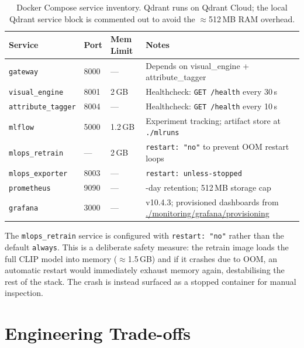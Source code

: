 \documentclass[12pt]{article}
\begin{document}
\begin{table}[H]
\centering
\small
\setlength{\tabcolsep}{4pt}
\begin{tabular}{@{} >{\RaggedRight\arraybackslash}p{2.8cm} p{0.9cm} p{1.4cm} >{\RaggedRight\arraybackslash}p{7.5cm} @{}}
\toprule
\textbf{Service} & \textbf{Port} & \textbf{Mem Limit} & \textbf{Notes} \\ \midrule
\texttt{gateway}          & 8000 & ---    & Depends on visual\_engine + attribute\_tagger \\[2pt]
\texttt{visual\_engine}   & 8001 & 2\,GB  & Healthcheck: \texttt{GET /health} every 30\,s \\[2pt]
\texttt{attribute\_tagger}& 8004 & ---    & Healthcheck: \texttt{GET /health} every 10\,s \\[2pt]
\texttt{mlflow}           & 5000 & 1.2\,GB& Experiment tracking; artifact store at \texttt{./mlruns} \\[2pt]
\texttt{mlops\_retrain}   & ---  & 2\,GB  & \texttt{restart: "no"} to prevent OOM restart loops \\[2pt]
\texttt{mlops\_exporter}  & 8003 & ---    & \texttt{restart: unless-stopped} \\[2pt]
\texttt{prometheus}       & 9090 & ---    & 15-day retention; 512\,MB storage cap \\[2pt]
\texttt{grafana}          & 3000 & ---    & v10.4.3; provisioned dashboards from \url{./monitoring/grafana/provisioning} \\ \bottomrule
\end{tabular}
\caption{Docker Compose service inventory. Qdrant runs on Qdrant Cloud; the local Qdrant service block is commented out to avoid the $\approx$512\,MB RAM overhead.}
\label{tab:compose}
\end{table}

\noindent The \texttt{mlops\_retrain} service is configured with \texttt{restart: "no"} rather than the default \texttt{always}. This is a deliberate safety measure: the retrain image loads the full CLIP model into memory ($\approx$1.5\,GB) and if it crashes due to OOM, an automatic restart would immediately exhaust memory again, destabilising the rest of the stack. The crash is instead surfaced as a stopped container for manual inspection.

\section{Engineering Trade-offs}
\label{sec:tradeoffs}
\end{document}
